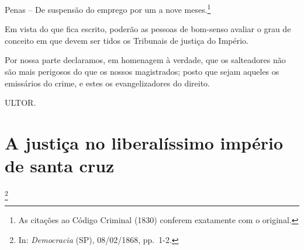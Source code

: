 Penas -- De suspensão do emprego por um a nove meses.\footnote{As
  citações ao Código Criminal (1830) conferem exatamente com o original.}

Em vista do que fica escrito, poderão as pessoas de bom-senso avaliar o
grau de conceito em que devem ser tidos os Tribunais de justiça do
Império.

Por nossa parte declaramos, em homenagem à verdade, que os salteadores
não são mais perigosos do que os nossos magistrados; posto que sejam
aqueles os emissários do crime, e estes os evangelizadores do direito.

ULTOR.

\chapter{A justiça no liberalíssimo império de santa cruz}\footnote{In:
  \emph{Democracia} (SP), 08/02/1868, pp.~1-2.}

